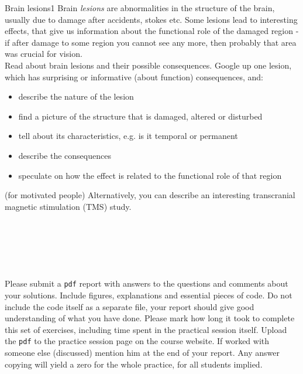 \documentclass[a4paper,11pt]{article}
\begin{document}
%
%
\begin{exercise}{4}{Brain lesions}{1}
Brain \emph{lesions} are abnormalities in the structure of the brain, usually due to damage after accidents, stokes etc. Some lesions lead to interesting effects, that give us information about the functional role of the damaged region - if after damage to some region you cannot see any more, then probably that area was crucial for vision. \\
Read about brain lesions and their possible consequences. Google up one lesion, which has surprising or informative (about function) consequences, and:
\begin{itemize}
\itemsep 0em
	\item describe the nature of the lesion
	\item find a picture of the structure that is damaged, altered or disturbed
	\item tell about its characteristics, e.g. is it temporal or permanent
	\item describe the consequences
	\item speculate on how the effect is related to the functional role of that region
\end{itemize}
(for motivated people) Alternatively, you can describe an interesting transcranial magnetic stimulation (TMS) study.
\end{exercise}


\ \\
\ \\
\ \\
\ \\
\ \\
Please submit a \texttt{pdf} report with answers to the questions and comments about your solutions. Include figures, explanations and essential pieces of code. Do not include the code itself as a separate file, your report should give good understanding of what you have done. Please mark how long it took to complete this set of exercises, including time spent in the practical session itself. Upload the \texttt{pdf} to the practice session page on the course website. If worked with someone else (discussed) mention him at the end of your report. Any answer copying will yield a zero for the whole practice, for all students implied.
\end{document}

